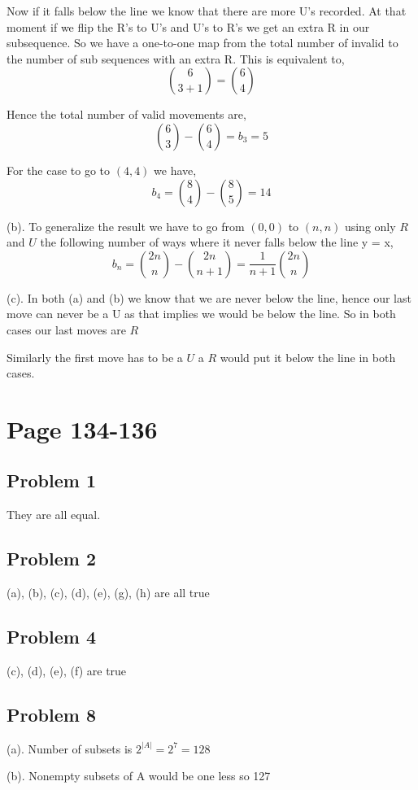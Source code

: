 \documentclass[a4paper]{report}
\begin{document}
Now if it falls below the line we know that there are more U's recorded. At that moment if we flip the R's to U's and U's to R's we get an extra R in our subsequence. So we have a one-to-one map from the total number of invalid to the number of sub sequences with an extra R. This is equivalent to,  
$$ {6 \choose 3 + 1} = {6 \choose 4}$$ 

Hence the total number of valid movements are, 
$$ {6 \choose 3} - {6 \choose 4} = b_3 = 5 $$ 


For the case to go to $(4,4)$ we have, 
$$ b_4 = {8 \choose 4} - {8 \choose 5} = 14 $$ 


(b). To generalize the result we have to go from $(0,0)$ to $(n,n)$ using only $R$ and  $U$ the following number of ways where it never falls below the line y = x,  
$$ b_n = {2n \choose n} - {2n \choose n + 1} = \frac{1}{n + 1} {2n \choose n } $$ 

(c). In both (a) and (b) we know that we are never below the line, hence our last move can never be a U as that implies we would be below the line. So in both cases our last moves are $R$

Similarly the first move has to be a $U$ a $R$ would put it below the line in both cases.


\section*{Page 134-136}
\subsection*{Problem 1}
They are all equal.

\subsection*{Problem 2}
(a), (b), (c), (d), (e), (g), (h) are all true

\subsection*{Problem 4}
(c), (d), (e), (f) are true

\subsection*{Problem 8}
(a). Number of subsets is $2^{|A|} = 2^{7} = 128$ 

(b). Nonempty subsets of A would be one less so 127
\end{document}
